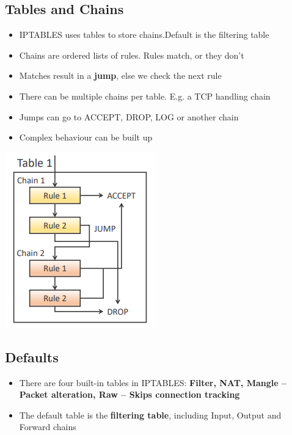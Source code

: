 \documentclass{article}
\begin{document}
\subsection{Tables and Chains}
\begin{multicols}{2}
\begin{itemize}
  \item IPTABLES uses tables to store chains.Default is the filtering table 
  \item Chains are ordered lists of rules. Rules match, or they don’t 
  \item Matches result in a \textbf{jump}, else we check the next rule
  \item There can be multiple chains per table. E.g. a TCP handling chain 
  \item Jumps can go to ACCEPT, DROP, LOG or another chain 
  \item Complex behaviour can be built up
\end{itemize}
\begin{center}
  \includegraphics[scale=0.7]{table_chain.png}
\end{center}
\end{multicols}

\subsection{Defaults}
\begin{itemize}
  \item There are four built-in tables in IPTABLES: \textbf{Filter, NAT, Mangle – Packet alteration, Raw – Skips connection tracking}
  \item The default table is the \textbf{filtering table}, including Input, Output and Forward chains
\end{itemize}
\end{document}
